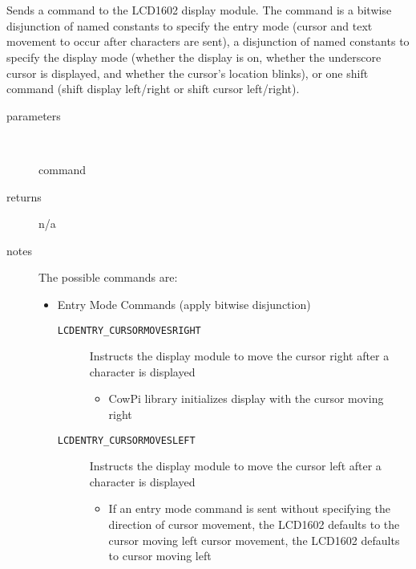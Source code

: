 \begin{itemize}
{             \\ \\
                Sends a command to the LCD1602 display module.
                The command is a bitwise disjunction of named constants to specify the entry mode (cursor and text movement to occur after characters are sent), a disjunction of named constants to specify the display mode (whether the display is on, whether the underscore cursor is displayed, and whether the cursor's location blinks), or one shift command (shift display left/right or shift cursor left/right).
                \begin{description}
                    \item[parameters] \
                    \begin{description}
                        \item[command]
                    \end{description}
                    \item[returns] n/a
                    \item[notes] The possible commands are:
                    \begin{itemize}
                        \item Entry Mode Commands {\tiny (apply bitwise disjunction)}
                            \begin{description}
                                \item[\texttt{LCDENTRY\_CURSORMOVESRIGHT}] Instructs the display module to move the cursor right after a character is displayed
                                    \begin{itemize}
                                        \item CowPi library initializes display with the cursor moving right
                                    \end{itemize}
                                \item[\texttt{LCDENTRY\_CURSORMOVESLEFT}] Instructs the display module to move the cursor left after a character is displayed
                                    \begin{itemize}
                                        \item If an entry mode command is sent without specifying the direction of cursor movement, the LCD1602 defaults to the cursor moving left cursor movement, the LCD1602 defaults to cursor moving left

\end{itemize}
\end{description}
\end{itemize}
\end{description}}
\end{itemize}
